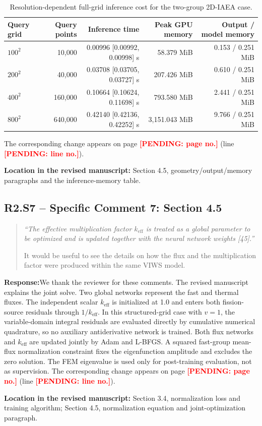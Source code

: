 \documentclass[11pt,a4paper]{article}
\newenvironment{reviewercomment}{\begin{quote}\small\itshape\color{commentgray}}{\end{quote}}
\newcommand{\authorresponse}{\noindent\textbf{Response:}\quad}
\newcommand{\revisionlocation}[1]{\par\noindent\textcolor{locationblue}{\textbf{Location in the revised manuscript: }}#1}
\newcommand{\draftplaceholder}[1]{\textcolor{red}{\textbf{[PENDING: #1]}}}
\begin{document}
\begin{table}[H]
\centering
\small
\caption{Resolution-dependent full-grid inference cost for the two-group 2D-IAEA case.}
\label{tab:response_iaea_memory}
\renewcommand{\arraystretch}{1.15}
\begin{tabularx}{\textwidth}{@{}lrrrr@{}}
\toprule
Query grid & Query points & Inference time & Peak GPU memory & Output / model memory \\
\midrule
$100^2$ & 10,000 & 0.00996 [0.00992, 0.00998] s & 58.379 MiB & 0.153 / 0.251 MiB \\
$200^2$ & 40,000 & 0.03708 [0.03705, 0.03727] s & 207.426 MiB & 0.610 / 0.251 MiB \\
$400^2$ & 160,000 & 0.10664 [0.10624, 0.11698] s & 793.580 MiB & 2.441 / 0.251 MiB \\
$800^2$ & 640,000 & 0.42140 [0.42136, 0.42252] s & 3,151.043 MiB & 9.766 / 0.251 MiB \\
\bottomrule
\end{tabularx}
\end{table}
The corresponding change appears on page \draftplaceholder{page no.} (line \draftplaceholder{line no.}).
\revisionlocation{Section 4.5, geometry/output/memory paragraphs and the inference-memory table.}

\subsection*{R2.S7 -- Specific Comment 7: Section 4.5}
\begin{reviewercomment}
``The effective multiplication factor $k_{\mathrm{eff}}$ is treated as a global parameter to be optimized and is updated together with the neural network weights [45].''

It would be useful to see the details on how the flux and the multiplication factor were produced within the same VIWS model.
\end{reviewercomment}
\authorresponse We thank the reviewer for these comments. The revised manuscript explains the joint solve. Two global networks represent the fast and thermal fluxes. The independent scalar $k_{\mathrm{eff}}$ is initialized at 1.0 and enters both fission-source residuals through $1/k_{\mathrm{eff}}$. In this structured-grid case with $v=1$, the variable-domain integral residuals are evaluated directly by cumulative numerical quadrature, so no auxiliary antiderivative network is trained. Both flux networks and $k_{\mathrm{eff}}$ are updated jointly by Adam and L-BFGS. A squared fast-group mean-flux normalization constraint fixes the eigenfunction amplitude and excludes the zero solution. The FEM eigenvalue is used only for post-training evaluation, not as supervision. The corresponding change appears on page \draftplaceholder{page no.} (line \draftplaceholder{line no.}).
\revisionlocation{Section 3.4, normalization loss and training algorithm; Section 4.5, normalization equation and joint-optimization paragraph.}
\end{document}
